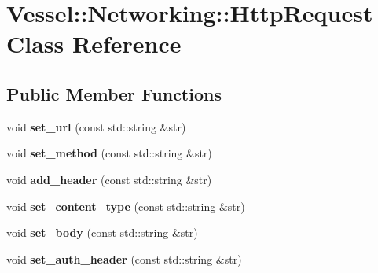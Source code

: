 \hypertarget{class_vessel_1_1_networking_1_1_http_request}{}\section{Vessel\+:\+:Networking\+:\+:Http\+Request Class Reference}
\label{class_vessel_1_1_networking_1_1_http_request}
\subsection*{Public Member Functions}
\begin{DoxyCompactItemize}
\item 
\mbox{\label{class_vessel_1_1_networking_1_1_http_request_a69e25a5c71c13bcf46cb042cbff8274b}} 
void {\bfseries set\+\_\+url} (const std\+::string \&str)
\item 
\mbox{\label{class_vessel_1_1_networking_1_1_http_request_a01b5329f00d6270d98042cc5fd943c40}} 
void {\bfseries set\+\_\+method} (const std\+::string \&str)
\item 
\mbox{\label{class_vessel_1_1_networking_1_1_http_request_a0edbd0445e9636e498a2a12807e6be18}} 
void {\bfseries add\+\_\+header} (const std\+::string \&str)
\item 
\mbox{\label{class_vessel_1_1_networking_1_1_http_request_a4ef063a4e4d9d037f39194d502c491cd}} 
void {\bfseries set\+\_\+content\+\_\+type} (const std\+::string \&str)
\item 
\mbox{\label{class_vessel_1_1_networking_1_1_http_request_a6f2c55559d9bf22c18782a944210c63a}} 
void {\bfseries set\+\_\+body} (const std\+::string \&str)
\item 
\mbox{\label{class_vessel_1_1_networking_1_1_http_request_a21e9d62ce0782cb8785a979b3bd04ae2}} 
void {\bfseries set\+\_\+auth\+\_\+header} (const std\+::string \&str)
\item 
\mbox{\label{class_vessel_1_1_networking_1_1_http_request_a6a84d3689dc11ac1b2f81ef64418452c}} 

\end{DoxyCompactItemize}
